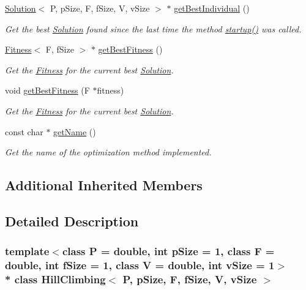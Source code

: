 \begin{DoxyCompactItemize}
\hyperlink{classSolution}{Solution}$<$ P, p\+Size, F, f\+Size, V, v\+Size $>$ $\ast$ \hyperlink{classHillClimbing_a13d4097b5483b2aaaff381af6b4ccf79}{get\+Best\+Individual} ()
\begin{DoxyCompactList}\small\item\em Get the best \hyperlink{classSolution}{Solution} found since the last time the method \hyperlink{classHillClimbing_a845d2e4cac39582bf1218a90431c2f3c}{startup()} was called. \end{DoxyCompactList}\item 
\hyperlink{structFitness}{Fitness}$<$ F, f\+Size $>$ $\ast$ \hyperlink{classHillClimbing_a9be3cc94cce8d67c953ddc17e6fcf84e}{get\+Best\+Fitness} ()
\begin{DoxyCompactList}\small\item\em Get the \hyperlink{structFitness}{Fitness} for the current best \hyperlink{classSolution}{Solution}. \end{DoxyCompactList}\item 
void \hyperlink{classHillClimbing_a8636abfe54f4628a782dc07f738f36d4}{get\+Best\+Fitness} (F $\ast$fitness)
\begin{DoxyCompactList}\small\item\em Get the \hyperlink{structFitness}{Fitness} for the current best \hyperlink{classSolution}{Solution}. \end{DoxyCompactList}\item 
const char $\ast$ \hyperlink{classHillClimbing_acef2d4e793b4377610d6625cba1cf1cc}{get\+Name} ()
\begin{DoxyCompactList}\small\item\em Get the name of the optimization method implemented. \end{DoxyCompactList}\end{DoxyCompactItemize}
\subsection*{Additional Inherited Members}


\subsection{Detailed Description}
\subsubsection*{template$<$class P = double, int p\+Size = 1, class F = double, int f\+Size = 1, class V = double, int v\+Size = 1$>$\\*
class Hill\+Climbing$<$ P, p\+Size, F, f\+Size, V, v\+Size $>$}

